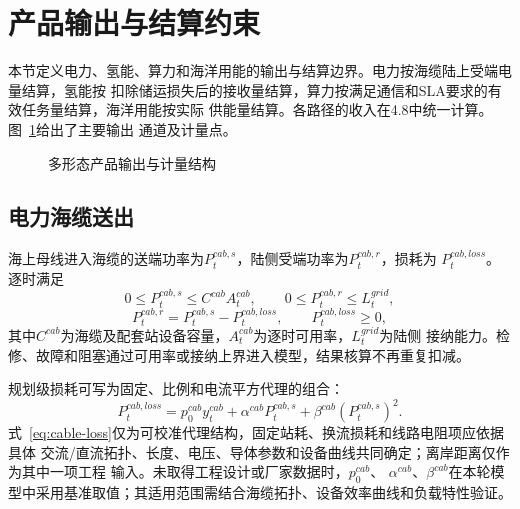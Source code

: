 \section{产品输出与结算约束}
\label{sec:product-delivery}

本节定义电力、氢能、算力和海洋用能的输出与结算边界。电力按海缆陆上受端电量结算，氢能按
扣除储运损失后的接收量结算，算力按满足通信和SLA要求的有效任务量结算，海洋用能按实际
供能量结算。各路径的收入在4.8中统一计算。图~\ref{fig:delivery-model}给出了主要输出
通道及计量点。

\begin{figure}[H]
\centering
\resizebox{0.94\textwidth}{!}{}
\caption{多形态产品输出与计量结构}
\label{fig:delivery-model}
\end{figure}

\subsection{电力海缆送出}

海上母线进入海缆的送端功率为$P_t^{cab,s}$，陆侧受端功率为$P_t^{cab,r}$，损耗为
$P_t^{cab,loss}$。逐时满足
\begin{equation}
0\le P_t^{cab,s}\le C^{cab}A_t^{cab},
\qquad 0\le P_t^{cab,r}\le L_t^{grid},
\label{eq:cable-send}
\end{equation}
\begin{equation}
P_t^{cab,r}=P_t^{cab,s}-P_t^{cab,loss},
\qquad P_t^{cab,loss}\ge 0,
\label{eq:cable-receive}
\end{equation}
其中$C^{cab}$为海缆及配套站设备容量，$A_t^{cab}$为逐时可用率，$L_t^{grid}$为陆侧
接纳能力。检修、故障和阻塞通过可用率或接纳上界进入模型，结果核算不再重复扣减。

规划级损耗可写为固定、比例和电流平方代理的组合：
\begin{equation}
P_t^{cab,loss}=p_0^{cab}y_t^{cab}
+\alpha^{cab}P_t^{cab,s}
+\beta^{cab}\left(P_t^{cab,s}\right)^2.
\label{eq:cable-loss}
\end{equation}
式~\eqref{eq:cable-loss}仅为可校准代理结构，固定站耗、换流损耗和线路电阻项应依据具体
交流/直流拓扑、长度、电压、导体参数和设备曲线共同确定；离岸距离仅作为其中一项工程
输入\cite{nrel-transmission}。未取得工程设计或厂家数据时，$p_0^{cab}$、
$\alpha^{cab}$、$\beta^{cab}$在本轮模型中采用基准取值；其适用范围需结合海缆拓扑、设备效率曲线和负载特性验证。

